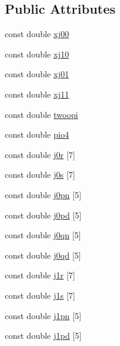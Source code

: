\subsection*{Public Attributes}
\begin{DoxyCompactItemize}
\item 
const double \hyperlink{structLuna_1_1Bessel_a69e31bcef81cee0b64a40efd2c6195ac}{xj00}
\item 
const double \hyperlink{structLuna_1_1Bessel_a40044c24955f5e771fd8cbef9fd06397}{xj10}
\item 
const double \hyperlink{structLuna_1_1Bessel_a9423de154e56c25f2615deaa699e1ad2}{xj01}
\item 
const double \hyperlink{structLuna_1_1Bessel_a7120d0fce9cdd7c7f650fb113d56a2ee}{xj11}
\item 
const double \hyperlink{structLuna_1_1Bessel_a4c3a3f91a127b39c913845c77f377c79}{twoopi}
\item 
const double \hyperlink{structLuna_1_1Bessel_a25963b9942422f3d48c0239e8be57f0c}{pio4}
\item 
const double \hyperlink{structLuna_1_1Bessel_a37ddc99f8caaca6814791a3f425370c5}{j0r} \mbox{[}7\mbox{]}
\item 
const double \hyperlink{structLuna_1_1Bessel_a1085d982e9d66d9c29da9798eedb4354}{j0s} \mbox{[}7\mbox{]}
\item 
const double \hyperlink{structLuna_1_1Bessel_aeb87c7ddc34900a7b9dcd123c49c31fe}{j0pn} \mbox{[}5\mbox{]}
\item 
const double \hyperlink{structLuna_1_1Bessel_af55d98ad282898bd505468892ccd1eb1}{j0pd} \mbox{[}5\mbox{]}
\item 
const double \hyperlink{structLuna_1_1Bessel_a5d64c71be5d9ec982587b391a3e2373f}{j0qn} \mbox{[}5\mbox{]}
\item 
const double \hyperlink{structLuna_1_1Bessel_a6f9e1aebe0a5d93388b3b14c67513886}{j0qd} \mbox{[}5\mbox{]}
\item 
const double \hyperlink{structLuna_1_1Bessel_a836feb9b56c106c385d3eb38324f6b2a}{j1r} \mbox{[}7\mbox{]}
\item 
const double \hyperlink{structLuna_1_1Bessel_a70050646ad99739a25c73bcf1d7be60e}{j1s} \mbox{[}7\mbox{]}
\item 
const double \hyperlink{structLuna_1_1Bessel_a0c4696a43b34189116152eac96fd58f1}{j1pn} \mbox{[}5\mbox{]}
\item 
const double \hyperlink{structLuna_1_1Bessel_a5db7fdd8d6855252dfe97b46c073a061}{j1pd} \mbox{[}5\mbox{]}
\item 

\end{DoxyCompactItemize}
